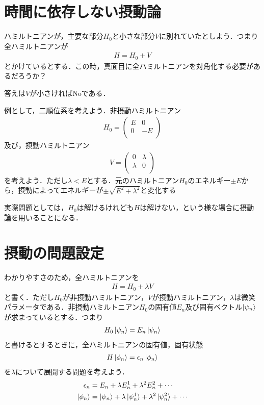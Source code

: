 \documentclass[a4j]{jarticle}
\begin{document}
\section{時間に依存しない摂動論}
ハミルトニアンが，主要な部分$H_0$と小さな部分$V$に別れていたとしよう．つまり全ハミルトニアンが
\begin{align*}
 H=H_0+V
\end{align*}
とかけているとする．この時，真面目に全ハミルトニアンを対角化する必要があるだろうか？

答えは$V$が小さければNoである．



例として，二順位系を考えよう．非摂動ハミルトニアン
\begin{align*}
 H_0=
 \begin{pmatrix}
  E & 0 \\
  0 & -E \\
 \end{pmatrix}
\end{align*}
及び，摂動ハミルトニアン
\begin{align*}
 V=
 \begin{pmatrix}
  0 & \lambda \\
  \lambda & 0\\
 \end{pmatrix}
\end{align*}
を考えよう．ただし$\lambda < E$とする．元のハミルトニアン$H_0$のエネルギー$\pm E$から，摂動によってエネルギーが$\pm \sqrt{E^2+\lambda^2}$と変化する

実際問題としては，$H_0$は解けるけれども$H$は解けない，という様な場合に摂動論を用いることになる．


\section{摂動の問題設定}
わかりやすさのため，全ハミルトニアンを
\begin{align*}
 H=H_0+\lambda V
\end{align*}
と書く．ただし$H_0$が非摂動ハミルトニアン，$V$が摂動ハミルトニアン，$\lambda$は微笑パラメータである．非摂動ハミルトニアン$H_0$の固有値$E_n$及び固有ベクトル$\ket{\psi_n}$が求まっているとする．つまり
\begin{align*}
 H_0\ket{\psi_n}=E_n\ket{\psi_n}
\end{align*}
と書けるとするときに，全ハミルトニアンの固有値，固有状態
\begin{align*}
 H\ket{\phi_n}=\epsilon_n\ket{\phi_n}
\end{align*}
を$\lambda$について展開する問題を考えよう．
\begin{align*}
 \epsilon_n&=E_n+\lambda E_n^1+\lambda^2E_n^2+\cdots \\
 \ket{\phi_n}&=\ket{\psi_n}+\lambda\ket{\psi_n^1}+ \lambda^2\ket{\psi_n^2}+\cdots \\
\end{align*}
\end{document}
